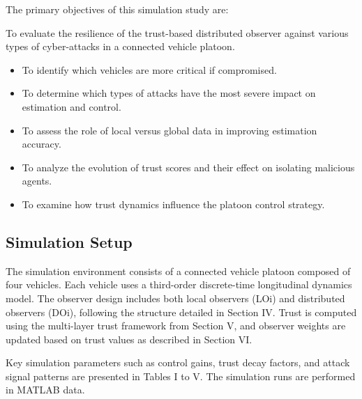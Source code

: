\documentclass[letterpaper, 10pt, conference]{ieeeconf}  %
\begin{document}
The primary objectives of this simulation study are:

To evaluate the resilience of the trust-based distributed observer against various types of cyber-attacks in a connected vehicle platoon.
\begin{itemize}
    \item To identify which vehicles are more critical if compromised.
 
    \item To determine which types of attacks have the most severe impact on estimation and control.
    \item To assess the role of local versus global data in improving estimation accuracy.

    \item To analyze the evolution of trust scores and their effect on isolating malicious agents.

    \item To examine how trust dynamics influence the platoon control strategy.

\end{itemize}





\subsection {Simulation Setup}

The simulation environment consists of a connected vehicle platoon composed of four vehicles. Each vehicle uses a third-order discrete-time longitudinal dynamics model. The observer design includes both local observers (LOi) and distributed observers (DOi), following the structure detailed in Section IV. Trust is computed using the multi-layer trust framework from Section V, and observer weights are updated based on trust values as described in Section VI.

Key simulation parameters such as control gains, trust decay factors, and attack signal patterns are presented in Tables I to V. The simulation runs are performed in MATLAB data.

\end{document}
